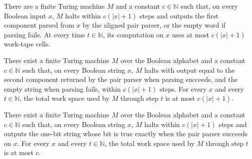 \begin{theorem}
\label{Turing.FinTM.computesFunInTime_pairFst_spaceUsed}
\leanok
{}
There are a finite Turing machine $M$ and a constant $c\in\mathbb{N}$ such that, on
every Boolean input $x$, $M$ halts within $c(|x|+1)$ steps and outputs the first
component parsed from $x$ by the aligned pair parser, or the empty word if parsing
fails. At every time $t\in\mathbb{N}$, its computation on $x$ uses at most $c(|x|+1)$
work-tape cells.
\end{theorem}

\begin{theorem}
\label{Turing.FinTM.computesFunInTime_pairSnd_spaceUsed}
\leanok
{}
There exist a finite Turing machine $M$ over the Boolean alphabet and a constant
$c\in\mathbb{N}$ such that, on every Boolean string $x$, $M$ halts with output equal to
the second component returned by the pair parser when parsing succeeds, and the empty
string when parsing fails, within $c(|x|+1)$ steps. For every $x$ and every
$t\in\mathbb{N}$, the total work space used by $M$ through step $t$ is at most
$c(|x|+1)$.
\end{theorem}

\begin{theorem}
\label{Turing.FinTM.computesFunInTime_pairValid_spaceUsed}
\leanok
{}
There exist a finite Turing machine $M$ over the Boolean alphabet and a constant
$c\in\mathbb{N}$ such that, on every Boolean string $x$, $M$ halts within $c(|x|+1)$
steps and outputs the one-bit string whose bit is true exactly when the pair parser
succeeds on $x$. For every $x$ and every $t\in\mathbb{N}$, the total work space used by
$M$ through step $t$ is at most $c$.
\end{theorem}

